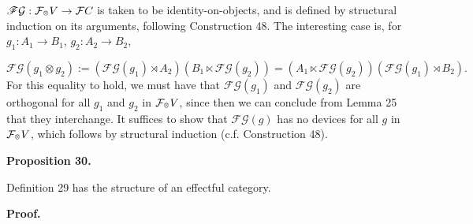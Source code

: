 $\mathscr{F}{\mathcal{G}}:\mathcal{F}_{\mathbin{\raisebox{1.25pt}{$\scriptscriptstyle\otimes$}}}V\to\mathcal{F}C$ is taken to be identity-on-objects, and is defined by structural induction on its arguments, following Construction 48. The interesting case is, for $g_{1}:A_{1}\to B_{1}$, $g_{2}:A_{2}\to B_{2}$,\par
    \[\mathscr{F}{\mathcal{G}}(g_{1}\otimes g_{2}):=(\mathscr{F}{\mathcal{G}}(g_{1})\rtimes A_{2})(B_{1}\ltimes\mathscr{F}{\mathcal{G}}(g_{2}))=(A_{1}\ltimes\mathscr{F}{\mathcal{G}}(g_{2}))(\mathscr{F}{\mathcal{G}}(g_{1})\rtimes B_{2}).\]    
For this equality to hold, we must have that $\mathscr{F}{\mathcal{G}}(g_{1})$ and $\mathscr{F}{\mathcal{G}}(g_{2})$ are orthogonal for all $g_{1}$ and $g_{2}$ in $\mathcal{F}_{\mathbin{\raisebox{1.25pt}{$\scriptscriptstyle\otimes$}}}V$, since then we can conclude from Lemma 25 that they interchange. It suffices to show that $\mathscr{F}{\mathcal{G}}(g)$ has no devices for all $g$ in $\mathcal{F}_{\mathbin{\raisebox{1.25pt}{$\scriptscriptstyle\otimes$}}}V$, which follows by structural induction (c.f. Construction 48).\par
 
 
  
 
 
 
\par\medskip\noindent\textbf{Proposition 30.}\par
 
 
Definition 29 has the structure of an effectful category.\par
 
 
 
 
 
\par\medskip\noindent\textbf{Proof.}\par
 
 
